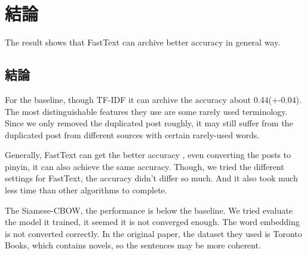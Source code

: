 \chapter{結論}

The result shows that FastText can archive better accuracy in general way. 

\section{結論}


For the baseline, though TF-IDF it can archive the accuracy about 0.44(+-0.04). The most distinguishable features they use are some rarely used terminology. Since we only removed the duplicated post roughly, it may still suffer from the duplicated post from different sources with certain rarely-used words. 

Generally, FastText can get the better accuracy , even converting the posts to pinyin, it can also achieve the same accuracy. Though, we tried the different settings for FastText, the accuracy didn't differ so much. And it also took much less time than other algorithms to complete.

The Siamese-CBOW, the performance is below the baseline. We tried evaluate the model it trained, it seemed it is not converged enough. The word embedding is not converted correctly. In the original paper, the dataset they used is Toronto Books, which contains novels, so the sentences may be more coherent. 